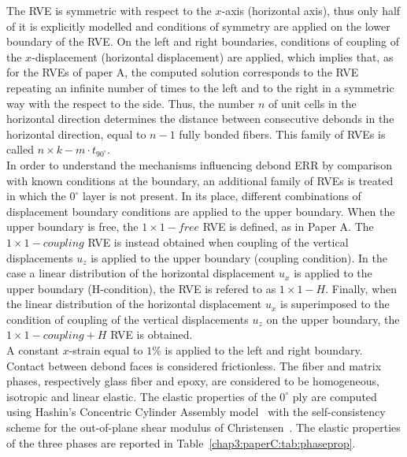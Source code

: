 The RVE is symmetric with respect to the $x$-axis (horizontal axis), thus only half of it is explicitly modelled and conditions of symmetry are applied on the lower boundary of the RVE. On the left and right boundaries, conditions of coupling of the $x$-displacement (horizontal displacement) are applied, which implies that, as for the RVEs of paper A, the computed solution corresponds to the RVE repeating an infinite number of times to the left and to the right in a symmetric way with the respect to the side. Thus, the number $n$ of unit cells in the horizontal direction determines the distance between consecutive debonds in the horizontal direction, equal to $n-1$ fully bonded fibers. This family of RVEs is called $n\times k-m\cdot t_{90^{\circ}}$.\\
In order to understand the mechanisms influencing debond ERR by comparison with known conditions at the boundary, an additional family of RVEs is treated in which the $0^{\circ}$ layer is not present. In its place, different combinations of displacement boundary conditions are applied to the upper boundary. When the upper boundary is free, the $1\times 1-free$ RVE is defined, as in Paper A. The $1\times 1-coupling$ RVE is instead obtained when coupling of the vertical displacements $u_{z}$ is applied to the upper boundary (coupling condition). In the case a linear distribution of the horizontal displacement $u_{x}$ is applied to the upper boundary (H-condition), the RVE is refered to as $1\times 1-H$. Finally, when the linear distribution of the horizontal displacement $u_{x}$ is superimposed to the condition of coupling of the vertical displacements $u_{z}$ on the upper boundary, the $1\times 1-coupling+H$ RVE is obtained.\\
A constant $x$-strain equal to $1\%$ is applied to the left and right boundary. Contact between debond faces is considered frictionless. The fiber and matrix phases, respectively glass fiber and epoxy, are considered to be homogeneous, isotropic and linear elastic. The elastic properties of the $0^{\circ}$ ply are computed using Hashin's Concentric Cylinder Assembly model~\cite{Hashin1983} with the self-consistency scheme for the out-of-plane shear modulus of Christensen~\cite{Christensen1979}. The elastic properties of the three phases are reported in Table~\ref{chap3:paperC:tab:phaseprop}.

